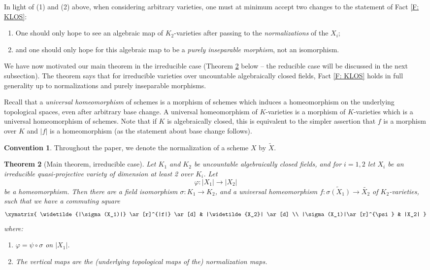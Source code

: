 \documentclass{amsart}
\newtheorem{theorem}{Theorem}[section]
\theoremstyle{definition}
\newtheorem{convention}[theorem]{Convention}
\begin{document}
In light of (1) and (2) above, when considering arbitrary varieties, one must at minimum accept two changes to the statement of Fact \ref{F: KLOS}:

\begin{enumerate}
    \item One should only hope to see an algebraic map of $K_2$-varieties after passing to the \textit{normalizations} of the $X_i$;
    \item and one should only hope for this algebraic map to be a \textit{\textit{purely inseparable morphism}}, not an isomorphism.
\end{enumerate}

We have now motivated our main theorem in the irreducible case (Theorem \ref{T: main} below -- the reducible case will be discussed in the next subsection). The theorem says that for irreducible varieties over uncountable algebraically closed fields, Fact \ref{F: KLOS} holds in full generality up to normalizations and purely inseparable morphisms. 


    Recall that a \textit{universal homeomorphism} of schemes is a morphism of schemes which induces a homeomorphism on the underlying topological spaces, even after arbitrary base change. A universal homeomorphism of $K$-varieties is a morphism of $K$-varieties which is a universal homeomorphism of schemes. Note that if $K$ is algebraically closed, this is equivalent to the simpler assertion that $f$ is a morphism over $K$ and $|f|$ is a homeomorphism (as the statement about base change follows). 
    


\begin{convention}
    Throughout the paper, we denote the normalization of a scheme $X$ by $\widetilde{X}$.
\end{convention}

\begin{theorem}[Main theorem, irreducible case]\label{T: main}
Let $K_1$ and $K_2$ be uncountable algebraically closed fields, and for $i=1,2$ let $X_i$ be an irreducible quasi-projective variety of dimension at least 2 over $K_i$. Let
\[
\varphi : |X_1| \to |X_2|
\]
be a homeomorphism. Then there are a field isomorphism $\sigma : K_1 \to K_2$, and a universal homeomorphism $f:\widetilde{\sigma(X_1)}\rightarrow\widetilde{X_2}$ of $K_2$-varieties, such that we have a commuting square
\[
\xymatrix{
\widetilde{|\sigma(X_1)|} \ar[r]^{|f|} \ar[d] & |\widetilde{X_2}| \ar[d] \\
|\sigma(X_1)|\ar[r]^{\psi} & |X_2|
}
\]
where:
\begin{enumerate}
\item $\varphi=\psi\circ\sigma$ on $|X_1|$.
\item The vertical maps are the (underlying topological maps of the) normalization maps.
\end{enumerate}
\end{theorem}
\end{document}
